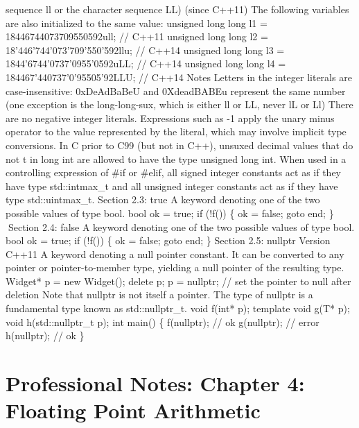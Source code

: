 sequence ll or the character sequence LL) (since C++11) The following
variables are also initialized to the same value: unsigned long long l1
= 18446744073709550592ull; // C++11 unsigned long long l2 =
18'446'744'073'709'550'592llu; // C++14 unsigned long long l3 =
1844'6744'0737'0955'0592uLL; // C++14 unsigned long long l4 =
184467'440737'0'95505'92LLU; // C++14 Notes Letters in the integer
literals are case-insensitive: 0xDeAdBaBeU and 0XdeadBABEu represent the
same number (one exception is the long-long-sux, which is either ll or
LL, never lL or Ll) There are no negative integer literals. Expressions
such as -1 apply the unary minus operator to the value represented by
the literal, which may involve implicit type conversions. In C prior to
C99 (but not in C++), unsuxed decimal values that do not t in long int
are allowed to have the type unsigned long int. When used in a
controlling expression of \#if or \#elif, all signed integer constants
act as if they have type std::intmax\_t and all unsigned integer
constants act as if they have type std::uintmax\_t. Section 2.3: true A
keyword denoting one of the two possible values of type bool. bool ok =
true; if (!f()) \{ ok = false; goto end; \} Section 2.4: false A
keyword denoting one of the two possible values of type bool. bool ok =
true; if (!f()) \{ ok = false; goto end; \} Section 2.5: nullptr Version
C++11 A keyword denoting a null pointer constant. It can be converted to
any pointer or pointer-to-member type, yielding a null pointer of the
resulting type. Widget* p = new Widget(); delete p; p = nullptr; // set
the pointer to null after deletion Note that nullptr is not itself a
pointer. The type of nullptr is a fundamental type known as
std::nullptr\_t. void f(int* p); template void g(T* p); void
h(std::nullptr\_t p); int main() \{ f(nullptr); // ok g(nullptr); //
error h(nullptr); // ok \}

\hypertarget{professional-notes-chapter-4-floating-point-arithmetic}{%
\chapter{Professional Notes: Chapter 4: Floating Point
Arithmetic}\label{professional-notes-chapter-4-floating-point-arithmetic}}

